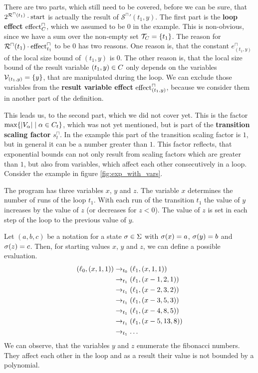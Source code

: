 There are two parts, which still need to be covered, before we can be sure, that $2^{{\mathcal{R}^\sqcap}(t_1)} \cdot \text{start}$ is actually the result of ${\mathcal{S}^\sqcap}'(t_1,y)$.
The first part is the \textbf{loop effect} $\text{effect}^\sqcap_C$, which we assumed to be $0$ in the example.
This is non-obvious, since we have a sum over the non-empty set $\mathcal{T}_C = \lbrace t_1 \rbrace$.
The reason for ${\mathcal{R}^\sqcap}(t_1) \cdot \text{effect}^\sqcap_{t_1}$ to be $0$ has two reasons.
One reason is, that the constant $e^\sqcap_{(t_1,y)}$ of the local size bound of $(t_1,y)$ is $0$.
The other reason is, that the local size bound of the result variable $(t_1,y) \in C$ only depends on the variables $\mathcal{V}_{(t_1,y)} = \lbrace y \rbrace$, that are manipulated during the loop.
We can exclude those variables from the \textbf{result variable effect} $\text{effect}^\sqcap_{(t_1,y)}$, because we consider them in another part of the definition.

This leads us, to the second part, which we did not cover yet.
This is the factor $\max \lbrace \left|V_\alpha\right| \mid \alpha \in C_t \rbrace$, which was not yet mentioned, but is part of the \textbf{transition scaling factor} $s^\sqcap_t$.
In the example this part of the transition scaling factor is $1$, but in general it can be a number greater than $1$.
This factor reflects, that exponential bounds can not only result from scaling factors which are greater than $1$, but also from variables, which affect each other consecutively in a loop.
Consider the example in figure \ref{fig:exp_with_vars}.



The program has three variables $x$, $y$ and $z$.
The variable $x$ determines the number of runs of the loop $t_1$.
With each run of the transition $t_1$ the value of $y$ increases by the value of $z$ (or decreases for $z < 0$).
The value of $z$ is set in each step of the loop to the previous value of $y$.

Let $(a,b,c)$ be a notation for a state $\sigma \in \Sigma$ with $\sigma(x) = a$, $\sigma(y) = b$ and $\sigma(z) = c$.
Then, for starting values $x$, $y$ and $z$, we can define a possible evaluation.
\begin{align*}
  (\ell_0, (x,1,1)) & \rightarrow_{t_0} (\ell_1, (x,1,1)) \\
  & \rightarrow_{t_1} (\ell_1, (x-1,2,1)) \\
  & \rightarrow_{t_1} (\ell_1, (x-2,3,2)) \\
  & \rightarrow_{t_1} (\ell_1, (x-3,5,3)) \\
  & \rightarrow_{t_1} (\ell_1, (x-4,8,5)) \\
  & \rightarrow_{t_1} (\ell_1, (x-5,13,8)) \\
  & \rightarrow_{t_1} \dots
\end{align*}
We can observe, that the variables $y$ and $z$ enumerate the fibonacci numbers.
They affect each other in the loop and as a result their value is not bounded by a polynomial.

